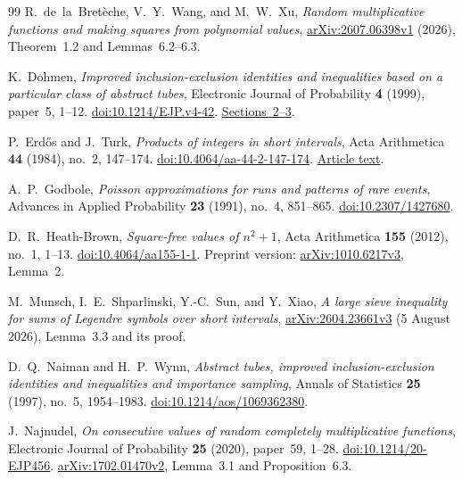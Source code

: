 \begin{thebibliography}{99}
R.~de~la~Bret\`eche, V.~Y.~Wang, and M.~W.~Xu,
\emph{Random multiplicative functions and making squares from
polynomial values},
\href{https://arxiv.org/abs/2607.06398v1}
{arXiv:2607.06398v1} (2026), Theorem~1.2 and
Lemmas~6.2--6.3.

K.~Dohmen,
\emph{Improved inclusion-exclusion identities and inequalities
based on a particular class of abstract tubes},
Electronic Journal of Probability \textbf{4} (1999), paper~5,
1--12.
\href{https://doi.org/10.1214/EJP.v4-42}
{doi:10.1214/EJP.v4-42}.
\href{https://www.maths.tcd.ie/EMIS/journals/EJP-ECP/article/download/42/42-83-1-PB.pdf}
{Sections~2--3}.

P.~Erd\H{o}s and J.~Turk,
\emph{Products of integers in short intervals},
Acta Arithmetica \textbf{44} (1984), no.~2, 147--174.
\href{https://doi.org/10.4064/aa-44-2-147-174}
{doi:10.4064/aa-44-2-147-174}.
\href{https://www.renyi.hu/~p_erdos/1984-17.pdf}
{Article text}.

A.~P.~Godbole,
\emph{Poisson approximations for runs and patterns of rare events},
Advances in Applied Probability \textbf{23} (1991), no.~4,
851--865.
\href{https://doi.org/10.2307/1427680}
{doi:10.2307/1427680}.

D.~R.~Heath-Brown,
\emph{Square-free values of \(n^2+1\)},
Acta Arithmetica \textbf{155} (2012), no.~1, 1--13.
\href{https://doi.org/10.4064/aa155-1-1}
{doi:10.4064/aa155-1-1}.
Preprint version:
\href{https://arxiv.org/abs/1010.6217v3}
{arXiv:1010.6217v3}, Lemma~2.

M.~Munsch, I.~E.~Shparlinski, Y.-C.~Sun, and Y.~Xiao,
\emph{A large sieve inequality for sums of Legendre symbols
over short intervals},
\href{https://arxiv.org/abs/2604.23661v3}
{arXiv:2604.23661v3} (5 August 2026), Lemma~3.3 and its proof.

D.~Q.~Naiman and H.~P.~Wynn,
\emph{Abstract tubes, improved inclusion-exclusion identities
and inequalities and importance sampling},
Annals of Statistics \textbf{25} (1997), no.~5, 1954--1983.
\href{https://doi.org/10.1214/aos/1069362380}
{doi:10.1214/aos/1069362380}.

J.~Najnudel,
\emph{On consecutive values of random completely multiplicative
functions},
Electronic Journal of Probability \textbf{25} (2020), paper~59,
1--28.
\href{https://doi.org/10.1214/20-EJP456}
{doi:10.1214/20-EJP456}.
\href{https://arxiv.org/abs/1702.01470v2}
{arXiv:1702.01470v2}, Lemma~3.1 and Proposition~6.3.


\end{thebibliography}
